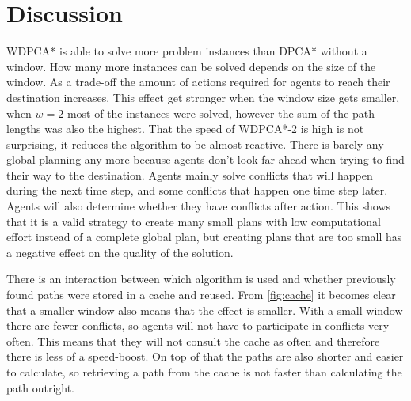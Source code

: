\section{Discussion}\label{sec:discussion}


WDPCA* is able to solve more problem instances than DPCA* without a window. How
many more instances can be solved depends on the size of the window. As a
trade-off the amount of actions required for agents to reach their destination
increases. This effect get stronger when the window size gets smaller, when
$w=2$ most of the instances were solved, however the sum of the path lengths
was also the highest. That the speed of WDPCA*-2 is high is not surprising, it
reduces the algorithm to be almost reactive. There is barely any global
planning any more because agents don't look far ahead when trying to find their
way to the destination. Agents mainly solve conflicts that will
happen during the next time step, and some conflicts that happen one time step
later. Agents will also determine whether they have conflicts after action.
This shows that it is a valid strategy to create many small plans with
low computational effort instead of a complete global plan, but creating plans
that are too small has a negative effect on the quality of the solution.

There is an interaction between which algorithm is used and whether previously
found paths were stored in a cache and reused. From \autoref{fig:cache} it
becomes clear that a smaller window also means that the effect is smaller. With
a small window there are fewer conflicts, so agents will not have to
participate in conflicts very often. This means that they will not consult the
cache as often and therefore there is less of a speed-boost. On top of that the
paths are also shorter and easier to calculate, so retrieving a path from the
cache is not faster than calculating the path outright.

